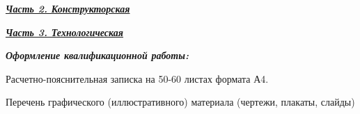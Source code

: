 \documentclass[utf8x, 14pt, oneside, a4paper]{article}
\begin{document}
	\begin{flushleft}
		\fontsize{12pt}{\baselineskip}\selectfont

		\textbf{\uline{\textit{Часть 2. Конструкторская}}}
		
		\uline{\hfill}
		
		\uline{\hfill}
		
		\uline{\hfill}

		\uline{\hfill}

		\uline{\hfill}

		\uline{\hfill}

		\uline{\hfill}

		\uline{\hfill}

		\uline{\hfill}

		\uline{\hfill}
	\end{flushleft}

	\begin{flushleft}
		\fontsize{12pt}{\baselineskip}\selectfont

		\textbf{\uline{\textit{Часть 3. Технологическая}}}
		
		\uline{\hfill}

		\uline{\hfill}

		\uline{\hfill}

		\uline{\hfill}

		\uline{\hfill}

		\uline{\hfill}
	\end{flushleft}

	\vfill

	\begin{flushleft}
		\fontsize{12pt}{\baselineskip}\selectfont

		\textbf{\textit{Оформление квалификационной работы:}}
		
		Расчетно-пояснительная записка на 50-60 листах формата А4.

		Перечень графического (иллюстративного) материала (чертежи, плакаты, слайды)
		
		\uline{\hfill}
		
		\uline{\hfill}
		
		\uline{\hfill}
		
		\uline{\hfill}
		
		\uline{\hfill}
		
		\uline{\hfill}

		\uline{\hfill}

		\uline{\hfill}

		\uline{\hfill}
	\end{flushleft}
\end{document}
